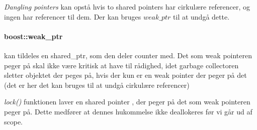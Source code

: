 \textit{Dangling pointers} kan opstå hvis to shared pointers har cirkulære referencer, og ingen har referencer til dem. Der kan bruges $weak\_ptr$ til at undgå dette.

\paragraph{boost::weak\_ptr}
kan tildeles en shared\_ptr, som den deler counter med.
Det som weak pointeren peger på skal ikke være kritisk at have til rådighed, idet garbage collectoren sletter objektet der peges på, hvis der kun er en weak pointer der peger på det (det er her det kan bruges til at undgå cirkulære referencer)

\textit{lock()} funktionen laver en shared pointer , der peger på det som weak pointeren peger på. Dette medfører at dennes hukommelse ikke deallokeres før vi går ud af scope.